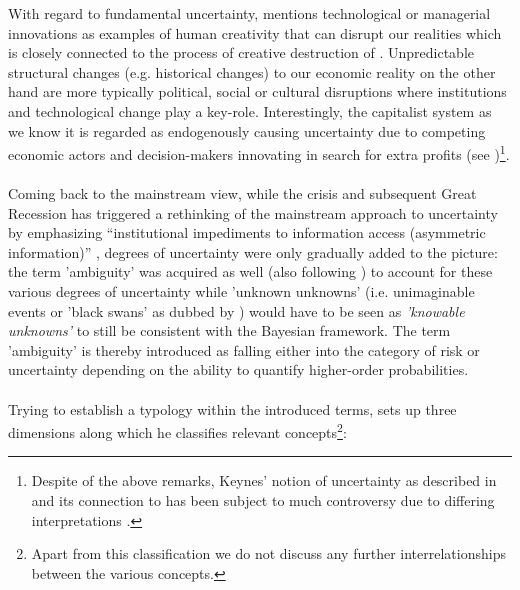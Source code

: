 \documentclass[a4paper,12pt,oneside,pointednumbers,bibtotoc,bigheadings,liststotoc]{scrbook}
\begin{document}
With regard to fundamental uncertainty, \citet{dequesh:00} mentions technological or managerial innovations as examples of human creativity that can disrupt our realities which is closely connected to the process of creative destruction of \citet{schumpeter:42}. Unpredictable structural changes (e.g. historical changes) to our economic reality on the other hand are more typically political, social or cultural disruptions where institutions and technological change play a key-role. Interestingly, the capitalist system as we know it is regarded as endogenously causing uncertainty due to competing economic actors and decision-makers innovating in search for extra profits (see \citealp{kregel:87})\footnote{Despite of the above remarks, Keynes' notion of uncertainty as described in \citet{keynes:21} and its connection to \citet{keynes:37} has been subject to much controversy due to differing interpretations \citep{dequesh:00}.}.\\
\\
Coming back to the mainstream view, while the crisis and subsequent Great Recession has triggered a rethinking of the mainstream approach to uncertainty by emphasizing ``institutional impediments to information access (asymmetric information)'' \citep[p. 8]{dow:16}, degrees of uncertainty were only gradually added to the picture: the term 'ambiguity' was acquired as well (also following \citealp[p. 330]{camererandweber:92}) to account for these various degrees of uncertainty while 'unknown unknowns' (i.e. unimaginable events or 'black swans' as dubbed by \citealp{taleb:08}) would have to be seen as \textit{'knowable unknowns'} to still be consistent with the Bayesian framework. The term 'ambiguity' is thereby introduced as falling either into the category of risk or uncertainty depending on the ability to quantify higher-order probabilities.
\\
\\
Trying to establish a typology within the introduced terms, \citet{dequech:14}  sets up three dimensions along which he classifies relevant concepts\footnote{Apart from this classification we do not discuss any further interrelationships between the various concepts.}: 
\end{document}
